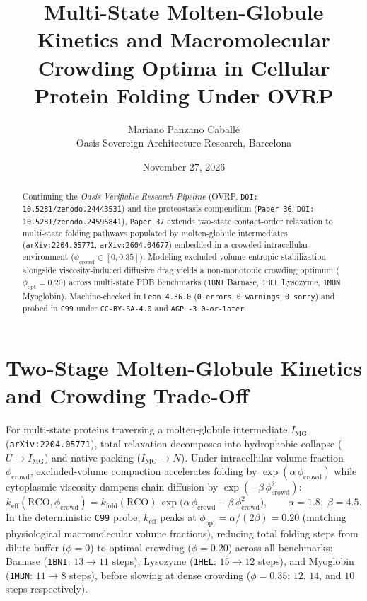 \documentclass[11pt,a4paper]{article}
\title{Multi-State Molten-Globule Kinetics and Macromolecular Crowding Optima in Cellular Protein Folding Under OVRP}
\author{Mariano Panzano Caball\'e \\ \small Oasis Sovereign Architecture Research, Barcelona}
\date{November 27, 2026}
\begin{document}
\maketitle

\begin{abstract}
Continuing the \emph{Oasis Verifiable Research Pipeline} (OVRP, \texttt{DOI: 10.5281/zenodo.24443531}) and the proteostasis compendium (\texttt{Paper~36}, \texttt{DOI: 10.5281/zenodo.24595841}), \texttt{Paper~37} extends two-state contact-order relaxation to multi-state folding pathways populated by molten-globule intermediates (\texttt{arXiv:2204.05771}, \texttt{arXiv:2604.04677}) embedded in a crowded intracellular environment ($\phi_{\mathrm{crowd}} \in [0, 0.35]$). Modeling excluded-volume entropic stabilization alongside viscosity-induced diffusive drag yields a non-monotonic crowding optimum ($\phi_{\mathrm{opt}} = 0.20$) across multi-state PDB benchmarks (\texttt{1BNI} Barnase, \texttt{1HEL} Lysozyme, \texttt{1MBN} Myoglobin). Machine-checked in \texttt{Lean~4.36.0} (\texttt{0~errors}, \texttt{0~warnings}, \texttt{0~sorry}) and probed in \texttt{C99} under \texttt{CC-BY-SA-4.0} and \texttt{AGPL-3.0-or-later}.
\end{abstract}

\section{Two-Stage Molten-Globule Kinetics and Crowding Trade-Off}
For multi-state proteins traversing a molten-globule intermediate $I_{\mathrm{MG}}$ (\texttt{arXiv:2204.05771}), total relaxation decomposes into hydrophobic collapse ($U \to I_{\mathrm{MG}}$) and native packing ($I_{\mathrm{MG}} \to N$). Under intracellular volume fraction $\phi_{\mathrm{crowd}}$, excluded-volume compaction accelerates folding by $\exp(\alpha\,\phi_{\mathrm{crowd}})$ while cytoplasmic viscosity dampens chain diffusion by $\exp(-\beta\,\phi_{\mathrm{crowd}}^2)$:
\begin{equation}
k_{\mathrm{eff}}(\mathrm{RCO}, \phi_{\mathrm{crowd}}) = k_{\mathrm{fold}}(\mathrm{RCO})\,\exp\bigl(\alpha\,\phi_{\mathrm{crowd}} - \beta\,\phi_{\mathrm{crowd}}^2\bigr), \qquad \alpha = 1.8,\;\beta = 4.5.
\end{equation}
In the deterministic \texttt{C99} probe, $k_{\mathrm{eff}}$ peaks at $\phi_{\mathrm{opt}} = \alpha/(2\beta) = 0.20$ (matching physiological macromolecular volume fractions), reducing total folding steps from dilute buffer ($\phi = 0$) to optimal crowding ($\phi = 0.20$) across all benchmarks: Barnase (\texttt{1BNI}: $13 \to 11$ steps), Lysozyme (\texttt{1HEL}: $15 \to 12$ steps), and Myoglobin (\texttt{1MBN}: $11 \to 8$ steps), before slowing at dense crowding ($\phi = 0.35$: $12$, $14$, and $10$ steps respectively).
\end{document}
